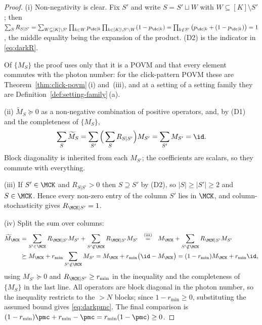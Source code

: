 \begin{proof}
(i) Non-negativity is clear. Fix $S'$ and write $S=S'\sqcup W$ with
$W\subseteq[K]\setminus S'$; then
$\sum_SR_{S|S'}=\sum_{W\subseteq[K]\setminus S'}
\prod_{k\in W}p_{\dc|k}\prod_{k\in[K]\setminus S'\setminus W}(1-p_{\dc|k})
=\prod_{k\notin S'}\big(p_{\dc|k}+(1-p_{\dc|k})\big)=1$, the middle equality
being the expansion of the product. (D2) is the indicator in
\eqref{eq:darkR}.

Of $\{M_S\}$ the proof uses only that it is a POVM and that every element
commutes with the photon number: for the click-pattern POVM these are
Theorem~\ref{thm:click-povm}\,(i) and~(iii), and at a setting of a setting
family they are Definition~\ref{def:setting-family}\,(a).

(ii) $\widetilde M_S\succeq0$ as a non-negative combination of positive
operators, and, by (D1) and the completeness of $\{M_S\}$,
\begin{equation}
  \sum_S\widetilde M_S=\sum_{S'}\Big(\sum_SR_{S|S'}\Big)M_{S'}
  =\sum_{S'}M_{S'}=\id .
\end{equation}
Block diagonality is inherited
from each $M_{S'}$; the coefficients are
scalars, so they commute with everything.

(iii) If $S'\in\MCK$ and $R_{S|S'}>0$ then $S\supseteq S'$ by (D2), so
$|S|\ge|S'|\ge2$ and $S\in\MCK$. Hence every non-zero entry of the column $S'$
lies in $\MCK$, and column-stochasticity gives $R_{\MCK|S'}=1$.

(iv) Split the sum over columns:
\begin{align}
  \widetilde M_{\MCK}
  &=\sum_{S'\in\MCK}R_{\MCK|S'}M_{S'}
   +\sum_{S'\notin\MCK}R_{\MCK|S'}M_{S'}
  \ \ \overset{\text{(iii)}}{=}\ \
   M_{\MCK}+\sum_{S'\notin\MCK}R_{\MCK|S'}M_{S'}\nonumber\\
  &\succeq M_{\MCK}+r_{\min}\sum_{S'\notin\MCK}M_{S'}
   =M_{\MCK}+r_{\min}\big(\id-M_{\MCK}\big)
   =(1-r_{\min})M_{\MCK}+r_{\min}\id ,
\end{align}
using $M_{S'}\succeq0$ and $R_{\MCK|S'}\ge r_{\min}$ in the inequality and
the completeness of $\{M_S\}$ in the last line. All operators are block diagonal
in the photon number, so the inequality restricts to the $>N$ blocks; since
$1-r_{\min}\ge0$, substituting the assumed bound gives \eqref{eq:darkpmc}. The
final comparison is
$(1-r_{\min})\pmc+r_{\min}-\pmc=r_{\min}(1-\pmc)\ge0$.
\end{proof}
